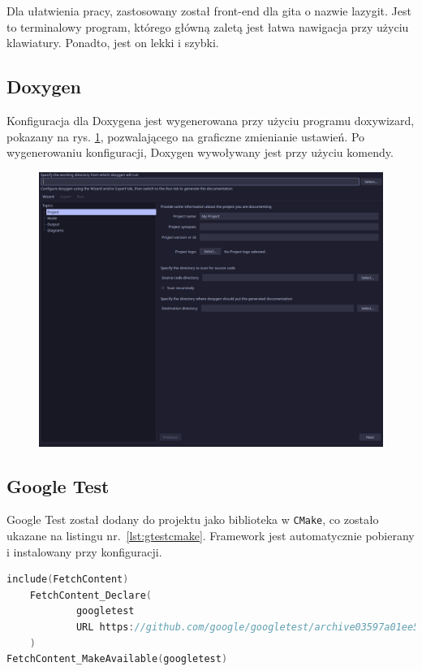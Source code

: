 Dla ułatwienia pracy, zastosowany został front-end dla gita o nazwie lazygit. Jest to terminalowy program, którego główną zaletą jest łatwa nawigacja przy użyciu klawiatury. Ponadto, jest on lekki i szybki.

\subsection{Doxygen}

Konfiguracja dla Doxygena jest wygenerowana przy użyciu programu doxywizard, pokazany na rys. \ref{fig:doxywizard}, pozwalającego na graficzne zmienianie ustawień. Po wygenerowaniu konfiguracji, Doxygen wywoływany jest przy użyciu komendy.

\begin{figure}[H]
	\centering
	\includegraphics[width=1\textwidth]{images/doxywizard.png}
	\caption{}
	\label{fig:doxywizard}
\end{figure}

\subsection{Google Test}

Google Test został dodany do projektu jako biblioteka w \texttt{CMake}, co zostało ukazane na listingu nr.~\ref{lst:gtestcmake}. Framework jest automatycznie pobierany i instalowany przy konfiguracji.

\begin{lstlisting}[caption=Dodanie Google Test do projektu, label={lst:gtestcmake}, language=C++]
include(FetchContent)
	FetchContent_Declare(
			googletest
			URL https://github.com/google/googletest/archive03597a01ee50ed33e9dfd640b249b4be3799d395.zip
	)
FetchContent_MakeAvailable(googletest)

\end{lstlisting}

